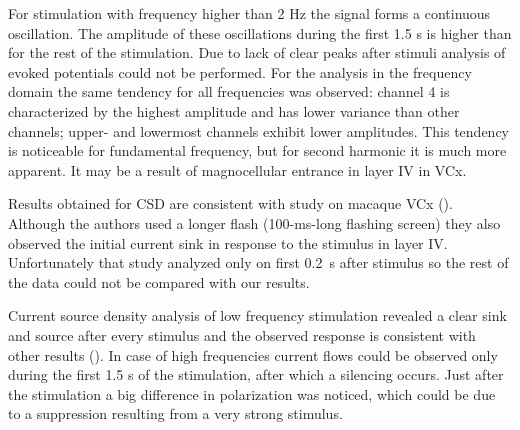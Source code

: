 \documentclass{pracalicmgr}
\begin{document}
    For stimulation with frequency higher than 2 Hz the signal forms a continuous oscillation. The amplitude of these oscillations during the first 1.5 s is higher than for the rest of the stimulation. Due to lack of clear peaks after stimuli analysis of evoked potentials could not be performed. For the analysis in the frequency domain the same tendency for all frequencies was observed: channel 4 is characterized by the highest amplitude and has lower variance than other channels; upper- and lowermost channels exhibit lower amplitudes. This tendency is noticeable for fundamental frequency, but for second harmonic it is much more apparent. It may be a result of magnocellular entrance in layer IV in VCx.
    
    Results obtained for CSD are consistent with study on macaque VCx (\cite{maier2011}). Although the authors used a longer flash (100-ms-long flashing screen) they also observed the initial current sink in response to the stimulus in layer IV. Unfortunately that study analyzed only on first 0.2~s after stimulus so the rest of the data could not be compared with our results. 
    
    Current source density analysis of low frequency stimulation revealed a clear sink and source after every stimulus and the observed response is consistent with other results (\cite{kozai, maier2010}). In case of high frequencies current flows could be observed only during the first 1.5 s of the stimulation, after which a silencing occurs. Just after the stimulation a big difference in polarization was noticed, which could be due to a suppression resulting from a very strong stimulus.
    

\printbibliography[heading=bibintoc]
\end{document}
